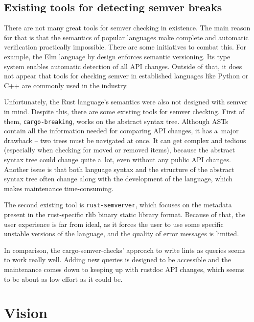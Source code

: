 \documentclass[licencjacka,en]{pracamgr}
\begin{document}
\section{Existing tools for detecting semver breaks}\label{r:section_existing_semver_tools}

There are not many great tools for semver checking in existence. The main reason for that is that
the semantics of popular languages make complete and automatic verification practically impossible.
There are some initiatives to combat this. For example, the Elm language \cite{elm-lang} by design
enforces semantic versioning. Its type system enables automatic detection of all API changes.
Outside of that, it does not appear that tools for checking semver in established languages like
Python or C++ are commonly used in the industry.

Unfortunately, the Rust language's semantics were also not designed with semver in mind.
Despite this, there are some existing tools for semver checking. First of them,
\texttt{cargo-breaking}, works on the abstract syntax tree. Although ASTs contain all the
information needed for comparing API changes, it has a~major drawback -- two trees must be
navigated at once. It can get complex and tedious (especially when checking for moved or removed
items), because the abstract syntax tree could change quite a~lot, even without any public API
changes. Another issue is that both language syntax and the structure of the abstract syntax tree
often change along with the development of the language, which makes maintenance time-consuming.

The second existing tool is \texttt{rust-semverver}, which focuses on the metadata present in the
rust-specific rlib binary static library format. Because of that, the user experience is far from
ideal, as it forces the user to use some specific unstable versions of the language, and the
quality of error messages is limited.

In comparison, the cargo-semver-checks' approach to write lints as queries seems to work
really well. Adding new queries is designed to be accessible and the maintenance comes down to
keeping up with rustdoc API changes, which seems to be about as low effort as it could be.



\chapter{Vision}\label{r:chapter_vision}
\end{document}
